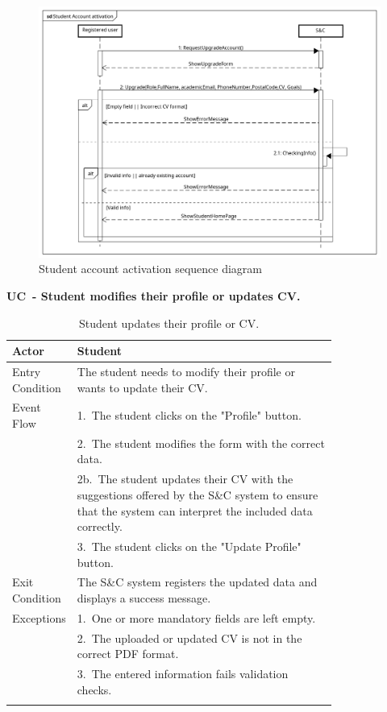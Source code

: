 \begin{figure}[H]
    \centering
    \includegraphics[width=1\linewidth]{Images/Sequence diagrams/Student account Attivation.png}
    \caption{Student account activation sequence diagram}
    \label{fig:enter-label}
\end{figure}

\textbf{UC\cuc\  - Student modifies their profile or updates CV.}

\begin{center}
    \renewcommand{\arraystretch}{1.2}
    \begin{longtable}{ l p{0.8\linewidth} } 
        \hline
        Actor & Student \\ \hline
        Entry Condition & The student needs to modify their profile or wants to update their CV. \\ \hline
        Event Flow & 1.\ The student clicks on the "Profile" button. \\
        & 2.\ The student modifies the form with the correct data. \\
        & 2b.\ The student updates their CV with the suggestions offered by the S\&C system to ensure that the system can interpret the included data correctly. \\ 
        & 3.\ The student clicks on the "Update Profile" button. \\ \hline
        Exit Condition & The S\&C system registers the updated data and displays a success message. \\ \hline
        Exceptions & 1.\ One or more mandatory fields are left empty. \\ 
        & 2.\ The uploaded or updated CV is not in the correct PDF format. \\ 
        & 3.\ The entered information fails validation checks. \\ \hline
        \caption{Student updates their profile or CV.}
        \label{tab:student_profile_update_uc}%
    \end{longtable}
\end{center}

